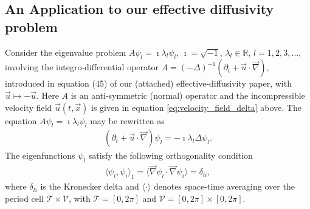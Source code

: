 \documentclass{article}
\newcommand{\Tc}{\mathcal{T}}
\newcommand{\Vc}{\mathcal{V}}
\newcommand{\0}{\mathbf{0}}
\newcommand{\1}{\mathbf{1}}
\newcommand{\2}{\mathbf{2}}
\newcommand{\3}{\mathbf{3}}
\newcommand{\4}{\mathbf{4}}
\newcommand{\5}{\mathbf{5}}
\newcommand{\6}{\mathbf{6}}
\newcommand{\7}{\mathbf{7}}
\newcommand{\8}{\mathbf{8}}
\begin{document}
%
\subsection{An Application to our effective diffusivity problem}
%
Consider the eigenvalue problem $A\psi_l=\imath\lambda_l\psi_l$, $\imath=\sqrt{-1}$,
$\lambda_l\in\mathbb{R}$, $l=1,2,3,\ldots$, involving the integro-differential operator
$A=(-\Delta)^{-1}(\partial_t+\vec{u}\cdot\vec{\nabla})$,  
introduced in equation (45) of our (attached) effective-diffusivity
paper, with $\vec{u}\mapsto-\vec{u}$. Here $A$ is an anti-symmetric (normal)
operator and the incompressible velocity field
$\vec{u}(t,\vec{x})$
is given in equation \eqref{eq:velocity_field_delta} above. The equation $A\psi_l=\imath\lambda_l\psi_l$ may be
rewritten as     
%
\begin{align}\label{eq:Eig_prob}
  (\partial_t+\vec{u}\cdot\vec{\nabla})\psi_l=-\imath\lambda_l\Delta\psi_l.
\end{align}
%
The eigenfunctions $\psi_l$ satisfy the following orthogonality condition
%
\begin{align}\label{eq:Orthogonal}
  \langle\psi_l,\psi_i\rangle_1=\langle\vec{\nabla}\psi_l\cdot\vec{\nabla}\psi_i\rangle=\delta_{li},
\end{align}
%
where $\delta_{li}$ is the Kronecker delta and $\langle\cdot\rangle$ denotes space-time
averaging over the period cell $\Tc\times\Vc$, with $\Tc=[0,2\pi]$ and
$\Vc=[0,2\pi]\times[0,2\pi]$.
\end{document}
